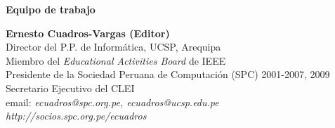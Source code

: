 \begin{center}
\textbf{\Huge Equipo de trabajo}
\end{center}
\vspace{1cm}

\begin{center}
\textbf{Ernesto Cuadros-Vargas (Editor)}\\
Director del P.P. de Informática, UCSP, Arequipa\\
Miembro del \textit{Educational Activities Board} de IEEE\\
Presidente de la Sociedad Peruana de Computación (SPC) 2001-2007, 2009\\
Secretario Ejecutivo del CLEI\\
email: \textit{ecuadros@spc.org.pe, ecuadros@ucsp.edu.pe}\\
\textit{http://socios.spc.org.pe/ecuadros}
\end{center}

\newpage
